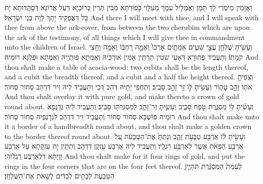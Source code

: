 {{וַאֲזָמֵין מֵימְרִי לָךְ תַּמָּן וַאֲמַלֵּיל עִמָּךְ מֵעִלָּוֵי כָּפוּרְתָּא מִבֵּין תְּרֵין כְּרוּבַיָּא דְּעַל אֲרוֹנָא דְּסָהֲדוּתָא יָת כָּל דַּאֲפַקֵּיד יָתָךְ לְוָת בְּנֵי יִשְׂרָאֵל׃}
{And there I will meet with thee, and I will speak with thee from above the ark-cover, from between the two cherubim which are upon the ark of the testimony, of all things which I will give thee in commandment unto the children of Israel.}{}
{וְעָשִׂ֥יתָ שֻׁלְחָ֖ן עֲצֵ֣י שִׁטִּ֑ים אַמָּתַ֤יִם אׇרְכּוֹ֙ וְאַמָּ֣ה רׇחְבּ֔וֹ וְאַמָּ֥ה וָחֵ֖צִי קֹמָתֽוֹ׃
}
{וְתַעֲבֵיד פָּתוּרָא דְּאָעֵי שִׁטִּין תַּרְתֵּין אַמִּין אוּרְכֵּיהּ וְאַמְּתָא פוּתְיֵיהּ וְאַמְּתָא וּפַלְגָּא רוּמֵיהּ׃}
{And thou shalt make a table of acacia-wood: two cubits shall be the length thereof, and a cubit the breadth thereof, and a cubit and a half the height thereof.}{}
{וְצִפִּיתָ֥ אֹת֖וֹ זָהָ֣ב טָה֑וֹר וְעָשִׂ֥יתָ לּ֛וֹ זֵ֥ר זָהָ֖ב סָבִֽיב׃
}
{וְתִחְפֵי יָתֵיהּ דְּהַב דְּכֵי וְתַעֲבֵיד לֵיהּ זִיר דִּדְהַב סְחוֹר סְחוֹר׃}
{And thou shalt overlay it with pure gold, and make thereto a crown of gold round about.}{}
{וְעָשִׂ֨יתָ לּ֥וֹ מִסְגֶּ֛רֶת טֹ֖פַח סָבִ֑יב וְעָשִׂ֧יתָ זֵר־זָהָ֛ב לְמִסְגַּרְתּ֖וֹ סָבִֽיב׃
}
{וְתַעֲבֵיד לֵיהּ גְּדָנְפָא רוּמֵיהּ פּוּשְׁכָּא סְחוֹר סְחוֹר וְתַעֲבֵיד זִיר דִּדְהַב לִגְדָנְפֵיהּ סְחוֹר סְחוֹר׃}
{And thou shalt make unto it a border of a handbreadth round about, and thou shalt make a golden crown to the border thereof round about.}{}
{וְעָשִׂ֣יתָ לּ֔וֹ אַרְבַּ֖ע טַבְּעֹ֣ת זָהָ֑ב וְנָתַתָּ֙ אֶת־הַטַּבָּעֹ֔ת עַ֚ל אַרְבַּ֣ע הַפֵּאֹ֔ת אֲשֶׁ֖ר לְאַרְבַּ֥ע רַגְלָֽיו׃}
{וְתַעֲבֵיד לֵיהּ אַרְבַּע עִזְקָן דִּדְהַב וְתִתֵּין יָת עִזְקָתָא עַל אַרְבַּע זָוְיָתָא דִּלְאַרְבַּע רַגְלוֹהִי׃}
{And thou shalt make for it four rings of gold, and put the rings in the four corners that are on the four feet thereof.}{}
{לְעֻמַּת֙ הַמִּסְגֶּ֔רֶת תִּהְיֶ֖יןָ הַטַּבָּעֹ֑ת לְבָתִּ֣ים לְבַדִּ֔ים לָשֵׂ֖את אֶת־הַשֻּׁלְחָֽן׃
}}
